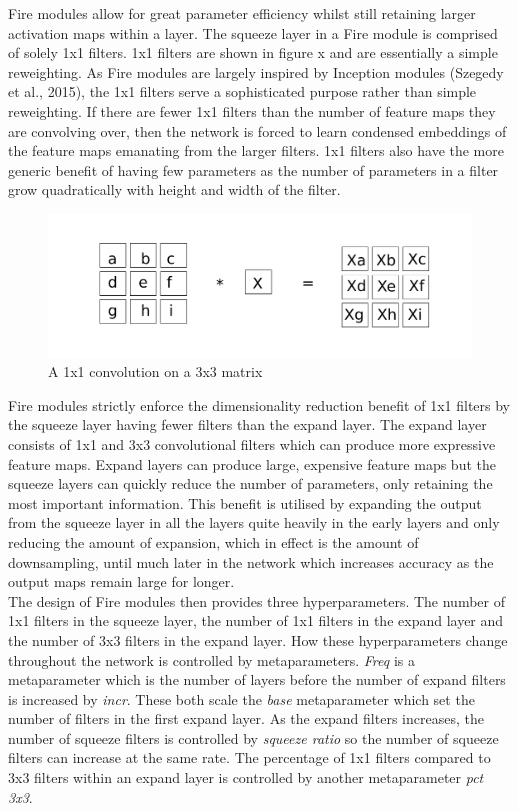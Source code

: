 \documentclass{article}
\begin{document}
Fire modules allow for great parameter efficiency whilst still retaining larger activation maps within a layer. The squeeze layer in a Fire module is comprised of solely 1x1 filters. 1x1 filters are shown in figure x and are essentially a simple reweighting. As Fire modules are largely inspired by Inception modules (Szegedy et al., 2015), the 1x1 filters serve a sophisticated purpose rather than simple reweighting. If there are fewer 1x1 filters than the number of feature maps they are convolving over, then the network is forced to learn condensed embeddings of the feature maps emanating from the larger filters. 1x1 filters also have the more generic benefit of having few parameters as the number of parameters in a filter grow quadratically with height and width of the filter.\\

\begin{figure}[h]
  \includegraphics[width=\linewidth]{convonebyone.pdf}
  \caption{A 1x1 convolution on a 3x3 matrix}
  \label{fig:conv1x1}
\end{figure}

Fire modules strictly enforce the dimensionality reduction benefit of 1x1 filters by the squeeze layer having fewer filters than the expand layer. The expand layer consists of 1x1 and 3x3 convolutional filters which can produce more expressive feature maps. Expand layers can produce large, expensive feature maps but the squeeze layers can quickly reduce the number of parameters, only retaining the most important information. This benefit is utilised by expanding the output from the squeeze layer in all the layers quite heavily in the early layers and only reducing the amount of expansion, which in effect is the amount of downsampling, until much later in the network which increases accuracy as the output maps remain large for longer.\\

The design of Fire modules then provides three hyperparameters. The number of 1x1 filters in the squeeze layer, the number of 1x1 filters in the expand layer and the number of 3x3 filters in the expand layer. How these hyperparameters change throughout the network is controlled by metaparameters. \emph{Freq} is a metaparameter which is the number of layers before the number of expand filters is increased by \emph{incr}. These both scale the \emph{base} metaparameter which set the number of filters in the first expand layer. As the expand filters increases, the number of squeeze filters is controlled by \emph{squeeze ratio} so the number of squeeze filters can increase at the same rate. The percentage of 1x1 filters compared to 3x3 filters within an expand layer is controlled by another metaparameter \emph{pct 3x3}. \\
\end{document}
